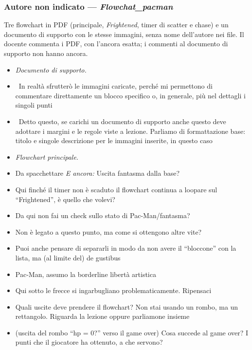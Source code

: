 \subsubsection{Autore non indicato --- \emph{Flowchat\_pacman}}
Tre flowchart in PDF (principale, \emph{Frightened}, timer di scatter e chase)
e un documento di supporto con le stesse immagini, senza nome dell'autore nei
file. Il docente commenta i PDF, con l'ancora esatta; i commenti al documento
di supporto non hanno ancora.
{\small
\begin{itemize}
  \item \emph{Documento di supporto.}
  \item \rvVuoto\ In realtà sfrutterò le immagini caricate, perché mi permettono di commentare direttamente un blocco specifico o, in generale, più nel dettagli i singoli punti
  \item \rvVuoto\ Detto questo, se carichi un documento di supporto anche questo deve adottare i margini e le regole viste a lezione. Parliamo di formattazione base: titolo e singole descrizione per le immagini inserite, in questo caso
  \item \emph{Flowchart principale.}
  \item {} Da spacchettare \emph{E ancora:} Uscita fantasma dalla base?
  \item {} Qui finché il timer non è scaduto il flowchart continua a loopare sul ``Frightened'', è quello che volevi?
  \item {} Da qui non fai un check sullo stato di Pac-Man/fantasma?
  \item {} Non è legato a questo punto, ma come si ottengono altre vite?
  \item {} Puoi anche pensare di separarli in modo da non avere il ``bloccone'' con la lista, ma (al limite del) de gustibus
  \item {} Pac-Man, assumo la borderline libertà artistica
  \item {} Qui sotto le frecce si ingarbugliano problematicamente. Ripensaci
  \item {} Quali uscite deve prendere il flowchart? Non stai usando un rombo, ma un rettangolo. Riguarda la lezione oppure parliamone insieme
  \item {} (uscita del rombo ``hp = 0?'' verso il game over) Cosa succede al game over? I punti che il giocatore ha ottenuto, a che servono?

\end{itemize}}
